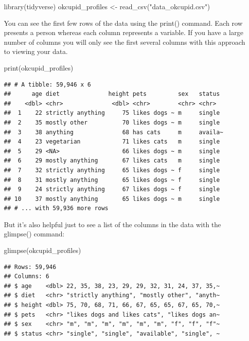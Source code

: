 \documentclass[
]{krantz}
\makeatletter
\newenvironment{Shaded}{\begin{snugshade}}{\end{snugshade}}
\newcommand{\FunctionTok}[1]{\textcolor[rgb]{0,0,0}{#1}}
\newcommand{\NormalTok}[1]{#1}
\newcommand{\OtherTok}[1]{\textcolor[rgb]{0.37,0.37,0.37}{#1}}
\newcommand{\StringTok}[1]{\textcolor[rgb]{0.5,0.5,0.5}{#1}}
\newenvironment{kframe}{%
\medskip{}
\setlength{\fboxsep}{.8em}
 \def\at@end@of@kframe{}%
 \ifinner\ifhmode%
  \def\at@end@of@kframe{\end{minipage}}%
  \begin{minipage}{\columnwidth}%
 \fi\fi%
 \def\FrameCommand##1{\hskip\@totalleftmargin \hskip-\fboxsep
 \colorbox{shadecolor}{##1}\hskip-\fboxsep
     \hskip-\linewidth \hskip-\@totalleftmargin \hskip\columnwidth}%
 \MakeFramed {\advance\hsize-\width
   \@totalleftmargin\z@ \linewidth\hsize
   \@setminipage}}%
 {\par\unskip\endMakeFramed%
 \at@end@of@kframe}
\renewenvironment{Shaded}{\begin{kframe}}{\end{kframe}}
\makeatother
\begin{document}
\begin{Shaded}
\begin{Highlighting}[]
\FunctionTok{library}\NormalTok{(tidyverse)}
\NormalTok{okcupid\_profiles }\OtherTok{\textless{}{-}} \FunctionTok{read\_csv}\NormalTok{(}\StringTok{"data\_okcupid.csv"}\NormalTok{)}
\end{Highlighting}
\end{Shaded}

You can see the first few rows of the data using the print() command. Each row presents a person whereas each column represents a variable. If you have a large number of columns you will only see the first several columns with this approach to viewing your data.

\begin{Shaded}
\begin{Highlighting}[]
\FunctionTok{print}\NormalTok{(okcupid\_profiles)}
\end{Highlighting}
\end{Shaded}

\begin{verbatim}
## # A tibble: 59,946 x 6
##      age diet              height pets         sex   status 
##    <dbl> <chr>              <dbl> <chr>        <chr> <chr>  
##  1    22 strictly anything     75 likes dogs ~ m     single 
##  2    35 mostly other          70 likes dogs ~ m     single 
##  3    38 anything              68 has cats     m     availa~
##  4    23 vegetarian            71 likes cats   m     single 
##  5    29 <NA>                  66 likes dogs ~ m     single 
##  6    29 mostly anything       67 likes cats   m     single 
##  7    32 strictly anything     65 likes dogs ~ f     single 
##  8    31 mostly anything       65 likes dogs ~ f     single 
##  9    24 strictly anything     67 likes dogs ~ f     single 
## 10    37 mostly anything       65 likes dogs ~ m     single 
## # ... with 59,936 more rows
\end{verbatim}

But it's also helpful just to see a list of the columns in the data with the glimpse() command:

\begin{Shaded}
\begin{Highlighting}[]
\FunctionTok{glimpse}\NormalTok{(okcupid\_profiles)}
\end{Highlighting}
\end{Shaded}

\begin{verbatim}
## Rows: 59,946
## Columns: 6
## $ age    <dbl> 22, 35, 38, 23, 29, 29, 32, 31, 24, 37, 35,~
## $ diet   <chr> "strictly anything", "mostly other", "anyth~
## $ height <dbl> 75, 70, 68, 71, 66, 67, 65, 65, 67, 65, 70,~
## $ pets   <chr> "likes dogs and likes cats", "likes dogs an~
## $ sex    <chr> "m", "m", "m", "m", "m", "m", "f", "f", "f"~
## $ status <chr> "single", "single", "available", "single", ~
\end{verbatim}
\end{document}
